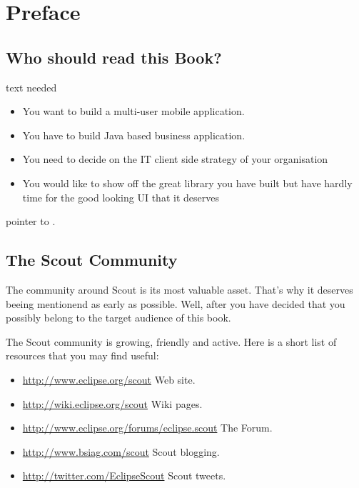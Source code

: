 \documentclass[a4paper,10pt,twoside]{book}
\begin{document}
  \sloppy
\fi


\chapter{Preface}


\section*{Who should read this Book?}

text needed

\begin{itemize}
\item You want to build a multi-user mobile application.
\item You have to build Java based business application. 
\item You need to decide on the IT client side strategy of your organisation
\item You would like to show off the great library you have built but have hardly time for the good looking UI that it deserves
\end{itemize}

pointer to .

\section*{The Scout Community}

The community around Scout is its most valuable asset. That's why it deserves 
beeing mentionend as early as possible. Well, after you have decided that 
you possibly belong to the target audience of this book.

The Scout community is growing, friendly and active.
Here is a short list of resources that you may find useful:

\begin{itemize}
\item \url{http://www.eclipse.org/scout} Web site.
\item \url{http://wiki.eclipse.org/scout} Wiki pages.
\item \url{http://www.eclipse.org/forums/eclipse.scout} The Forum.
\item \url{http://www.bsiag.com/scout} Scout blogging.
\item \url{http://twitter.com/EclipseScout} Scout tweets.
\end{itemize}
\end{document}
